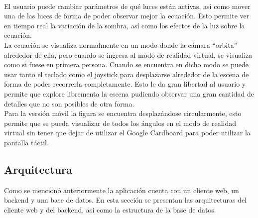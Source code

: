 \documentclass[12pt]{article}
\begin{document}
\\El usuario puede cambiar parámetros de qué luces están activas, así como mover una de las luces de forma de poder observar mejor la ecuación. Esto permite ver en tiempo real la variación de la sombra, así como los efectos de la luz sobre la ecuación. 
\\La ecuación se visualiza normalmente en un modo donde la cámara “orbita” alrededor de ella, pero cuando se ingresa al modo de realidad virtual, se visualiza como si fuese en primera persona. Cuando se encuentra en dicho modo se puede usar tanto el teclado como el joystick para desplazarse alrededor de la escena de forma de poder recorrerla completamente. Esto le da gran libertad al usuario y permite que explore librementa la escena pudiendo observar una gran cantidad de detalles que no son posibles de otra forma.
\\Para la versión móvil la figura se encuentra desplazándose circularmente, esto permite que se pueda visualizar de todos los ángulos en el modo de realidad virtual sin tener que dejar de utilizar el Google Cardboard para poder utilizar la pantalla táctil.
\clearpage
\subsection{Arquitectura}
Como se mencionó anteriormente la aplicación cuenta con un cliente web, un backend y una base de datos. En esta sección se presentan las arquitecturas del cliente web y del backend, así como la estructura de la base de datos.
\end{document}
